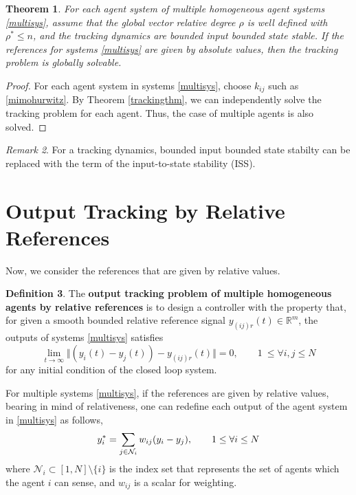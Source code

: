 \documentclass[11pt, a4paper, oneside, openany, reqno]{book}
\newtheorem{theorem}{Theorem}[chapter]
\theoremstyle{definition}
\newtheorem{definition}[theorem]{Definition}
\theoremstyle{remark}
\newtheorem{remark}[theorem]{Remark}
\numberwithin{equation}{chapter} %
\newcommand{\R}{\ensuremath{{\mathbb R}}}
\newcommand{\NBR}{\mathcal{N}}
\begin{document}
\begin{theorem}
	For each agent system of multiple homogeneous agent systems \eqref{multisys}, 
	assume that the global vector relative degree $ \rho $ is well defined with $ \rho^* \leq n $, 
	and the tracking dynamics are bounded input bounded state stable. 
	If the references for systems \eqref{multisys} are given by absolute values,
	then the tracking problem is globally solvable.
\end{theorem}

\begin{proof}
	For each agent system in systems \eqref{multisys}, choose $ k_{ij} $ such as \eqref{mimohurwitz}. 
	By Theorem \ref{trackingthm}, we can independently solve the tracking problem for each agent.
	Thus, the case of multiple agents is also solved.
\end{proof}

\begin{remark}
	For a tracking dynamics, bounded input bounded state stabilty can be replaced with
	the term of the input-to-state stability (ISS).
\end{remark}

\section{Output Tracking by Relative References}

Now, we consider the references that are given by relative values.

\begin{definition}
	The \textbf{output tracking problem of multiple homogeneous agents by relative references} is 
	to design a controller with the property that, 
	for given a smooth bounded relative reference signal $ y_{(ij)r}(t) \in \R^m$, 
	the outputs of systems \eqref{multisys} satisfies 
	\begin{equation}\label{defreltrack}
	\lim_{t \to \infty}\Vert (y_i(t) - y_j(t)) - y_{(ij)r}(t) \Vert = 0, 
	\qquad 1\ \leq \forall i,j \leq N 
	\end{equation}
	for any initial condition of the closed loop system.
\end{definition}

For multiple systems \eqref{multisys}, if the references are given by relative values,
bearing in mind of relativeness, one can redefine each output of the agent system in \eqref{multisys}
as follows, 
\begin{equation}\label{newout}
y_i^* =\sum_{j \in \NBR_i}w_{ij}(y_i-y_j), \qquad  1 \leq \forall i \leq N\\
\end{equation} 
where $ \NBR_i \subset [1,N] \setminus \lbrace i \rbrace $ is the index set that represents
the set of agents which the agent $ i $ can sense, and $ w_{ij} $ is a scalar for weighting.
\end{document}
